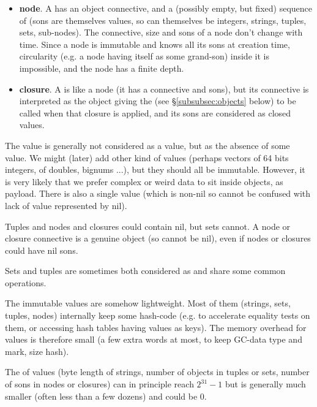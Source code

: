 \begin{itemize}
  \item \textbf{node}. A  has an object connective,
    and a (possibly empty, but fixed) sequence of 
    (sons are themselves values, so can themselves be integers,
    strings, tuples, sets, sub-nodes). The connective, size and sons
    of a node don't change with time. Since a node is immutable and
    knows all its sons at creation time, circularity (e.g. a node
    having itself as some grand-son) inside it is impossible, and the
    node has a finite depth.

  \item \textbf{closure}. A  is like a node
    (it has a connective and sons), but its connective is interpreted
    as the object giving the  (see
    §\ref{subsubsec:objects} below) to be called when that closure is
    applied, and its sons are considered as closed values.
        
\end{itemize}

The  value is generally not considered as a
value, but as the absence of some value. We might (later) add other
kind of values (perhaps vectors of 64 bits integers, of doubles,
bignums ...), but they should all be immutable. However, it is very
likely that we prefer complex or weird data to sit inside objects, as
payload. There is also a single
 value (which is non-nil so
cannot be confused with lack of value represented by nil).

Tuples and nodes and closures could contain nil, but sets cannot. A
node or closure connective is a genuine object (so cannot be nil),
even if nodes or closures could have nil sons.

Sets and tuples are sometimes both considered as
 and share some common operations.

The immutable values are somehow lightweight. Most of them (strings,
sets, tuples, nodes) internally keep some hash-code (e.g. to
accelerate equality tests on them, or accessing hash tables having
values as keys). The memory overhead for values is therefore small (a
few extra words at most, to keep GC-data type and mark, size hash).

The  of values (byte length of strings, number of objects in
tuples or sets, number of sons in nodes or closures) can in principle reach
$2^{31} - 1$ but is generally much smaller (often less than a few
dozens) and could be 0.

